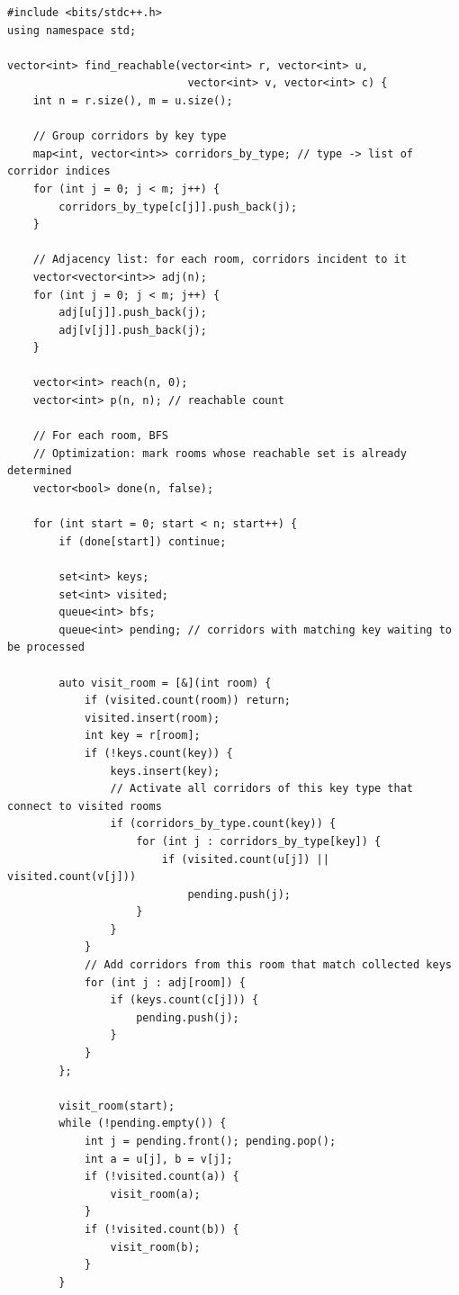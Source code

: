 \documentclass[11pt,a4paper]{article}
\begin{document}
\begin{lstlisting}
#include <bits/stdc++.h>
using namespace std;

vector<int> find_reachable(vector<int> r, vector<int> u,
                            vector<int> v, vector<int> c) {
    int n = r.size(), m = u.size();

    // Group corridors by key type
    map<int, vector<int>> corridors_by_type; // type -> list of corridor indices
    for (int j = 0; j < m; j++) {
        corridors_by_type[c[j]].push_back(j);
    }

    // Adjacency list: for each room, corridors incident to it
    vector<vector<int>> adj(n);
    for (int j = 0; j < m; j++) {
        adj[u[j]].push_back(j);
        adj[v[j]].push_back(j);
    }

    vector<int> reach(n, 0);
    vector<int> p(n, n); // reachable count

    // For each room, BFS
    // Optimization: mark rooms whose reachable set is already determined
    vector<bool> done(n, false);

    for (int start = 0; start < n; start++) {
        if (done[start]) continue;

        set<int> keys;
        set<int> visited;
        queue<int> bfs;
        queue<int> pending; // corridors with matching key waiting to be processed

        auto visit_room = [&](int room) {
            if (visited.count(room)) return;
            visited.insert(room);
            int key = r[room];
            if (!keys.count(key)) {
                keys.insert(key);
                // Activate all corridors of this key type that connect to visited rooms
                if (corridors_by_type.count(key)) {
                    for (int j : corridors_by_type[key]) {
                        if (visited.count(u[j]) || visited.count(v[j]))
                            pending.push(j);
                    }
                }
            }
            // Add corridors from this room that match collected keys
            for (int j : adj[room]) {
                if (keys.count(c[j])) {
                    pending.push(j);
                }
            }
        };

        visit_room(start);
        while (!pending.empty()) {
            int j = pending.front(); pending.pop();
            int a = u[j], b = v[j];
            if (!visited.count(a)) {
                visit_room(a);
            }
            if (!visited.count(b)) {
                visit_room(b);
            }
        }


\end{lstlisting}
\end{document}
